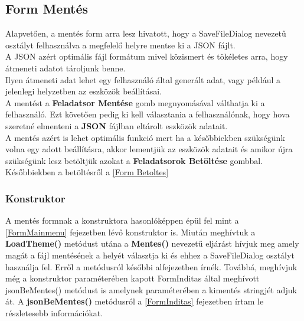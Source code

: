 \documentclass[tocnopagenum]{thesis-ekf}
\theoremstyle{definition}
\theoremstyle{remark}
\begin{document}
	
	\subsection{Form Mentés}
	\label{Form Mentes}
	 Alapvetően, a mentés form arra lesz hivatott, hogy a SaveFileDialog nevezetű osztályt felhasználva a megfelelő helyre mentse ki a JSON fájlt.
	\\
	A JSON azért optimális fájl formátum mivel közismert és tökéletes arra, hogy átmeneti adatot tároljunk benne. 
	\\
	Ilyen átmeneti adat lehet egy felhasználó által generált adat, vagy például a jelenlegi helyzetben az eszközök beállításai. 
	\\
	A mentést a \textbf{Feladatsor Mentése} gomb megnyomásával válthatja ki a felhasználó. Ezt követően pedig ki kell választania a felhasználónak, hogy hova szeretné elmenteni a \textbf{JSON} fájlban eltárolt eszközök adatait.
	\\
	A mentés azért is lehet optimális funkció mert ha a későbbiekben szükségünk volna egy adott beállításra, akkor lementjük az eszközök adatait és amikor újra szükségünk lesz betöltjük azokat a \textbf{Feladatsorok Betöltése} gombbal. Későbbiekben a betöltésről a \ref{Form Betoltes}
	\subsubsection{Konstruktor}
	A mentés formnak a konstruktora hasonlóképpen épül fel mint a \ref{FormMainmenu} fejezetben lévő konstruktor is. 
	Miután meghívtuk a \textbf{LoadTheme()} metódust utána a \textbf{Mentes()} nevezetű eljárást hívjuk meg amely magát a fájl mentésének a helyét választja ki és ehhez a SaveFileDialog osztályt használja fel. Erről a metódusról későbbi alfejezetben írnék.
	Továbbá, meghívjuk még a konstruktor paraméterében kapott FormInditas által meghívott jsonBeMentes() metódust is amelynek paraméterében a kimentés stringjét adjuk át. A \textbf{jsonBeMentes()} metódusról a \ref{FormInditas} fejezetben írtam le részletesebb információkat.
\end{document}
